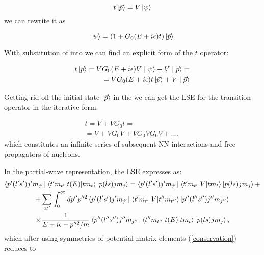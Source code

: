    \begin{equation}
        t \ket{\vec{p}} = V \ket{\psi}
        \label{t-op}
    \end{equation}
    we can rewrite it as 

    \begin{equation}
        \ket{\psi} = (1 + G_0(E + i\epsilon) t)  \ket {\vec{p}}
        \label{psi_toper}
    \end{equation}

    With substitution of  into  we can find
    an explicit form of the $t$ operator:

    \begin{eqnarray}
        t \ket{\vec{p}} = V G_0(E + i\epsilon)V \mid \psi \rangle +  V \mid \vec{p} \rangle = \nonumber\\
        = V G_0(E + i\epsilon) t \ket{\vec{p}} +  V \mid \vec{p} \rangle
        \label{top2}
    \end{eqnarray}

    Getting rid off the initial state $\ket{\vec{p}}$ in the  we can get the LSE
    for the transition operator in the iterative form:

    \begin{eqnarray}
        t = V + V G_0 t = \nonumber\\
        = V + V G_0 V + V G_0 V G_0V + ...,
    \end{eqnarray}
    which constitutes an infinite series of subsequent NN interactions and free propagators of nucleons.

    In the partial-wave representation, the LSE  expresses as:
    \begin{multline}
        \bra{p^\prime (l^\prime s^\prime)j'm_{j'}}\matrixel{t' m_{t'}}{t(E)}{t m_t}\ket{p (l s)jm_{j}} = 
        \bra{p^\prime (l^\prime s^\prime)j'm_{j'}}\matrixel{t' m_{t'}}{V}{t m_t}\ket{p (l s)jm_{j}} + \\
        +\sum_{\alpha^{\prime\prime}} \int_0^\infty dp^{\prime \prime} p^{\prime \prime 2}
        \bra{p^\prime (l^\prime s^\prime)j'm_{j'}}\matrixel{t' m_{t'}}{V}
        {t'' m_{t''}}\ket{p'' (l'' s'')j''m_{j''}} \\
        \cross \frac{1}{E + i\epsilon - p^{\prime \prime 2}/m}
        \bra{p'' (l'' s'')j''m_{j''}}\matrixel{t'' m_{t''}}{t(E)}{t m_t}\ket{p (l s)jm_{j}},
        \label{lse_pwd}
    \end{multline}
    which after using symmetries of potential matrix elements (\ref{conservation}) reduces to
    
